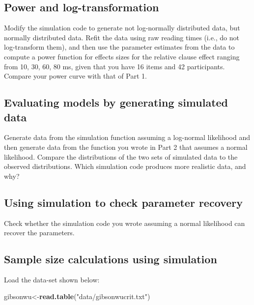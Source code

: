 \documentclass[12pt,]{krantz}
\newenvironment{Shaded}{\begin{snugshade}}{\end{snugshade}}
\newcommand{\KeywordTok}[1]{\textcolor[rgb]{0.13,0.29,0.53}{\textbf{#1}}}
\newcommand{\NormalTok}[1]{#1}
\newcommand{\StringTok}[1]{\textcolor[rgb]{0.31,0.60,0.02}{#1}}
\begin{document}
\hypertarget{sec:SimulationexercisesPart2}{%
\subsection{Power and log-transformation}\label{sec:SimulationexercisesPart2}}

Modify the simulation code to generate not log-normally distributed data, but normally distributed data. Refit the \citet{grodner} data using raw reading times (i.e., do not log-transform them), and then use the parameter estimates from the data to compute a power function for effects sizes for the relative clause effect ranging from 10, 30, 60, 80 ms, given that you have 16 items and 42 participants. Compare your power curve with that of Part 1.

\hypertarget{sec:SimulationexercisesPart3}{%
\subsection{Evaluating models by generating simulated data}\label{sec:SimulationexercisesPart3}}

Generate data from the simulation function assuming a log-normal likelihood and then generate data from the function you wrote in Part 2 that assumes a normal likelihood. Compare the distributions of the two sets of simulated data to the observed distributions. Which simulation code produces more realistic data, and why?

\hypertarget{sec:SimulationexercisesPart4}{%
\subsection{Using simulation to check parameter recovery}\label{sec:SimulationexercisesPart4}}

Check whether the simulation code you wrote assuming a normal likelihood can recover the parameters.

\hypertarget{sec:SimulationexercisesPart5}{%
\subsection{Sample size calculations using simulation}\label{sec:SimulationexercisesPart5}}

Load the data-set shown below:

\begin{Shaded}
\begin{Highlighting}[]
\NormalTok{gibsonwu<-}\KeywordTok{read.table}\NormalTok{(}\StringTok{"data/gibsonwucrit.txt"}\NormalTok{)}
\end{Highlighting}
\end{Shaded}
\end{document}
